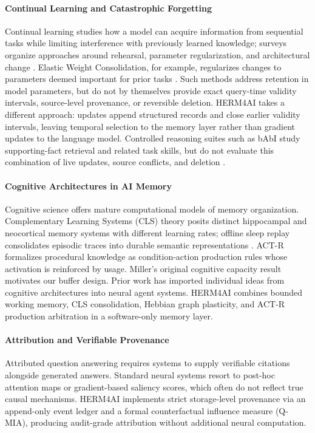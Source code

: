 \documentclass[11pt,a4paper,twocolumn]{article}
\newcommand{\herm}{\textsc{HERM4AI}}
\begin{document}
\paragraph{Continual Learning and Catastrophic Forgetting}
Continual learning studies how a model can acquire information from
sequential tasks while limiting interference with previously learned
knowledge; surveys organize approaches around rehearsal, parameter
regularization, and architectural change
\citep{delange2021continual}. Elastic Weight Consolidation, for
example, regularizes changes to parameters deemed important for prior
tasks \citep{kirkpatrick2017ewc}. Such methods address retention in
model parameters, but do not by themselves provide exact query-time
validity intervals, source-level provenance, or reversible deletion.
HERM4AI takes a different approach: updates append structured records
and close earlier validity intervals, leaving temporal selection to
the memory layer rather than gradient updates to the language model.
Controlled reasoning suites such as bAbI study supporting-fact
retrieval and related task skills, but do not evaluate this combination
of live updates, source conflicts, and deletion
\citep{weston2015towards}.

\paragraph{Cognitive Architectures in AI Memory}
Cognitive science offers mature computational models of memory
organization.  Complementary Learning Systems (CLS) theory
\citep{mcclelland1995cls} posits distinct hippocampal and neocortical
memory systems with different learning rates; offline sleep replay
consolidates episodic traces into durable semantic representations
\citep{diekelmann2010memory}.  ACT-R \citep{anderson1993rules} formalizes
procedural knowledge as condition-action production rules whose
activation is reinforced by usage.  Miller's original cognitive
capacity result \citep{miller1956magical} motivates our buffer design.
Prior work has imported individual ideas from cognitive architectures
into neural agent systems. HERM4AI combines bounded working memory,
CLS consolidation, Hebbian graph plasticity, and ACT-R production
arbitration in a software-only memory layer.

\paragraph{Attribution and Verifiable Provenance}
Attributed question answering \citep{bohnet2022attributed} requires
systems to supply verifiable citations alongside generated answers.
Standard neural systems resort to post-hoc attention maps or
gradient-based saliency scores, which often do not reflect true causal
mechanisms.  \herm{} implements strict storage-level provenance via an
append-only event ledger and a formal counterfactual influence measure
(Q-MIA), producing audit-grade attribution without additional
neural computation.
\end{document}
